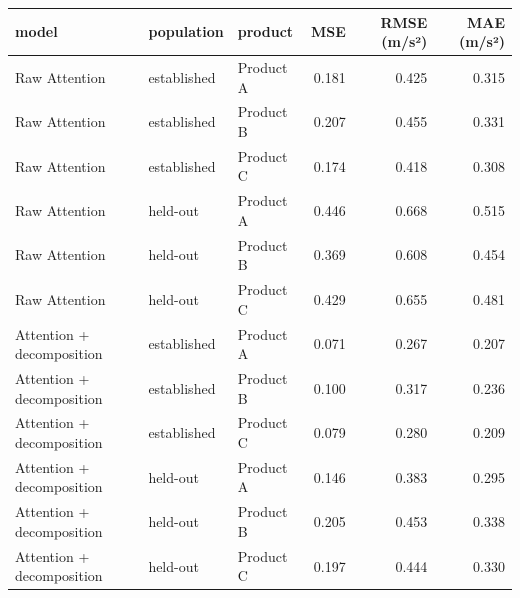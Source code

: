 \begin{tabular}{lllrrr}
\toprule
model & population & product & MSE & RMSE (m/s²) & MAE (m/s²) \\
\midrule
Raw Attention & established & Product A & 0.181 & 0.425 & 0.315 \\
Raw Attention & established & Product B & 0.207 & 0.455 & 0.331 \\
Raw Attention & established & Product C & 0.174 & 0.418 & 0.308 \\
Raw Attention & held-out & Product A & 0.446 & 0.668 & 0.515 \\
Raw Attention & held-out & Product B & 0.369 & 0.608 & 0.454 \\
Raw Attention & held-out & Product C & 0.429 & 0.655 & 0.481 \\
Attention + decomposition & established & Product A & 0.071 & 0.267 & 0.207 \\
Attention + decomposition & established & Product B & 0.100 & 0.317 & 0.236 \\
Attention + decomposition & established & Product C & 0.079 & 0.280 & 0.209 \\
Attention + decomposition & held-out & Product A & 0.146 & 0.383 & 0.295 \\
Attention + decomposition & held-out & Product B & 0.205 & 0.453 & 0.338 \\
Attention + decomposition & held-out & Product C & 0.197 & 0.444 & 0.330 \\
\bottomrule
\end{tabular}
